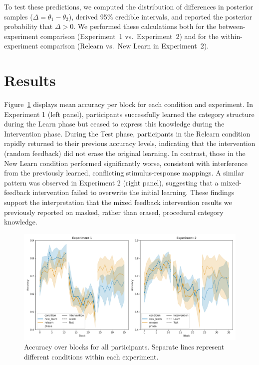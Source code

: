 \documentclass{article}
\begin{document}
To test these predictions, we computed the distribution of
differences in posterior samples ($\Delta = \theta_1 -
\theta_2$), derived 95\% credible intervals, and reported
the posterior probability that $\Delta > 0$. We performed
these calculations both for the between-experiment
comparison (Experiment~1 vs.\ Experiment~2) and for the
within-experiment comparison (Relearn vs.\ New Learn in
Experiment~2).

\section{Results}
Figure~\ref{fig_learning_curves} displays mean accuracy per
block for each condition and experiment. In Experiment 1
(left panel), participants successfully learned the category
structure during the Learn phase but ceased to express this
knowledge during the Intervention phase. During the Test
phase, participants in the Relearn condition rapidly
returned to their previous accuracy levels, indicating that
the intervention (random feedback) did not erase the
original learning. In contrast, those in the New Learn
condition performed significantly worse, consistent with
interference from the previously learned, conflicting
stimulus-response mappings. A similar pattern was observed
in Experiment 2 (right panel), suggesting that a
mixed-feedback intervention failed to overwrite the initial
learning. These findings support the interpretation that the
mixed feedback intervention results we previously reported
on masked, rather than erased, procedural category
knowledge.

\begin{figure}[H]
    \centering
    \includegraphics[width=\textwidth]{../figures/subjects_accuracy_all.png}
    \caption{
        Accuracy over blocks for all participants. Separate
        lines represent different conditions within each
        experiment.
}
\label{fig_learning_curves}
\end{figure}
\end{document}

